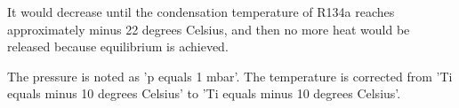 It would decrease until the condensation temperature of R134a reaches approximately minus 22 degrees Celsius, and then no more heat would be released because equilibrium is achieved.

The pressure is noted as 'p equals 1 mbar'.  
The temperature is corrected from 'Ti equals minus 10 degrees Celsius' to 'Ti equals minus 10 degrees Celsius'.